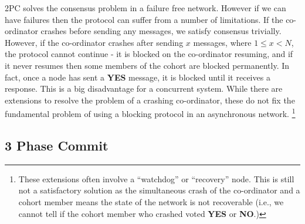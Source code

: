 \documentclass[12pt,twoside,notitlepage]{report}
\newcommand{\msg}[1] {{\bf #1}}         %
\begin{document}

2PC solves the consensus problem in a failure free network. However if we can have failures then
the protocol can suffer from a number of limitations. If the co-ordinator crashes before sending
any messages, we satisfy consensus trivially. However, if the co-ordinator crashes after sending
$x$ messages, where $1 \le x < N$, the protocol cannot continue - it is blocked on the
co-ordinator resuming, and if it never resumes then some members of the cohort are blocked
permanently. In fact, once a node has sent a \msg{YES} message, it is blocked until it receives a
response. This is a big disadvantage for a concurrent system. While there are extensions to
resolve the problem of a crashing co-ordinator, these do not fix the fundamental problem of using
a blocking protocol in an asynchronous network. \footnote{These extensions often involve a ``watchdog'' or
``recovery'' node. This is still not a satisfactory solution as the simultaneous crash of the
co-ordinator and a cohort member means the state of the network is not recoverable (i.e., we cannot
tell if the cohort member who crashed voted \msg{YES} or \msg{NO}.)}

\subsection*{3 Phase Commit}
\end{document}
